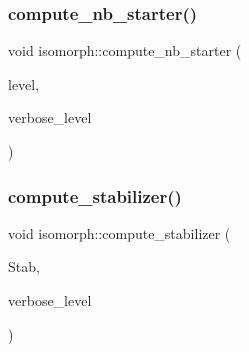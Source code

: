 \mbox{\label{classisomorph_ac899e1617283a043eab938ee0f84ea51}} 
\subsubsection{\texorpdfstring{compute\+\_\+nb\+\_\+starter()}{compute\_nb\_starter()}}
{\footnotesize\ttfamily void isomorph\+::compute\+\_\+nb\+\_\+starter (\begin{DoxyParamCaption}\item[{\mbox{\hyperlink{galois_8h_a09fddde158a3a20bd2dcadb609de11dc}{I\+NT}}}]{level,  }\item[{\mbox{\hyperlink{galois_8h_a09fddde158a3a20bd2dcadb609de11dc}{I\+NT}}}]{verbose\+\_\+level }\end{DoxyParamCaption})}

\mbox{\label{classisomorph_a572339d59deb788702ad3ede7a64c32f}} 
\subsubsection{\texorpdfstring{compute\+\_\+stabilizer()}{compute\_stabilizer()}}
{\footnotesize\ttfamily void isomorph\+::compute\+\_\+stabilizer (\begin{DoxyParamCaption}\item[{\mbox{\hyperlink{classsims}{sims}} $\ast$\&}]{Stab,  }\item[{\mbox{\hyperlink{galois_8h_a09fddde158a3a20bd2dcadb609de11dc}{I\+NT}}}]{verbose\+\_\+level }\end{DoxyParamCaption})}

\mbox{\label{classisomorph_a894cb7cc3e1ce703af74cb8e7aade287}} 
